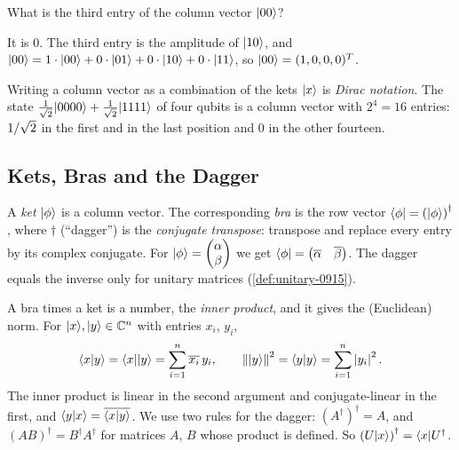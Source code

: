 \begin{exercisebox}
\begin{exercise}\label{ex:basis-0915}
    What is the third entry of the column vector $\lvert 00 \rangle$?
\end{exercise}
\tcblower
\begin{wsolution}
    It is $0$. The third entry is the amplitude of $\lvert 10 \rangle$, and
    $\lvert 00 \rangle = 1 \cdot \lvert 00 \rangle + 0 \cdot \lvert 01 \rangle + 0 \cdot \lvert 10 \rangle + 0 \cdot \lvert 11 \rangle$, so
    $\lvert 00 \rangle = (1, 0, 0, 0)^T$.
\end{wsolution}
\end{exercisebox}

Writing a column vector as a combination of the kets $\lvert x \rangle$ is \emph{Dirac notation}. The state
$\frac{1}{\sqrt{2}} \lvert 0000 \rangle + \frac{1}{\sqrt{2}} \lvert 1111 \rangle$ of four qubits is a column vector
with $2^4 = 16$ entries: $1/\sqrt{2}$ in the first and in the last position and $0$ in the
other fourteen.

\subsection{Kets, Bras and the Dagger}

A \emph{ket} $\lvert \phi \rangle$ is a column vector. The corresponding \emph{bra} is the row vector
$\langle \phi \rvert = \left(\lvert \phi \rangle\right)^\dagger$, where $\dagger$ (``dagger'') is the
\emph{conjugate transpose}: transpose and replace every entry by its complex conjugate. For
$\lvert \phi \rangle = \begin{pmatrix} \alpha \\ \beta \end{pmatrix}$ we get
$\langle \phi \rvert = \begin{pmatrix} \overline{\alpha} & \overline{\beta} \end{pmatrix}$. The dagger equals
the inverse only for unitary matrices (\cref{def:unitary-0915}).

A bra times a ket is a number, the \emph{inner product}, and it gives the (Euclidean) norm. For
$\lvert x \rangle, \lvert y \rangle \in \mathbb{C}^n$ with entries $x_i$, $y_i$,
\[\langle x \vert y \rangle = \langle x \rvert \lvert y \rangle = \sum_{i=1}^{n} \overline{x_i} \, y_i,
    \qquad
    \left\lVert \lvert y \rangle \right\rVert^2 = \langle y \vert y \rangle = \sum_{i=1}^{n} \left\lvert y_i\right\rvert^2.\]
The inner product is linear in the second argument and conjugate-linear in the first, and
$\langle y \vert x \rangle = \overline{\langle x \vert y \rangle}$. We use two rules for the dagger:
$(A^\dagger)^\dagger = A$, and $(AB)^\dagger = B^\dagger A^\dagger$ for matrices $A$, $B$ whose
product is defined. So $\left(U \lvert x \rangle\right)^\dagger = \langle x \rvert U^\dagger$.

